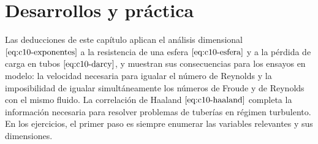\documentclass[10pt,openany]{book}
\begin{document}
\section{Desarrollos y práctica}

Las deducciones de este capítulo aplican el análisis dimensional \(\eqref{eq:c10-exponentes}\) a la resistencia de una esfera \(\eqref{eq:c10-esfera}\) y a la pérdida de carga en tubos \(\eqref{eq:c10-darcy}\), y muestran sus consecuencias para los ensayos en modelo: la velocidad necesaria para igualar el número de Reynolds y la imposibilidad de igualar simultáneamente los números de Froude y de Reynolds con el mismo fluido. La correlación de Haaland \(\eqref{eq:c10-haaland}\) completa la información necesaria para resolver problemas de tuberías en régimen turbulento. En los ejercicios, el primer paso es siempre enumerar las variables relevantes y sus dimensiones.
\end{document}
